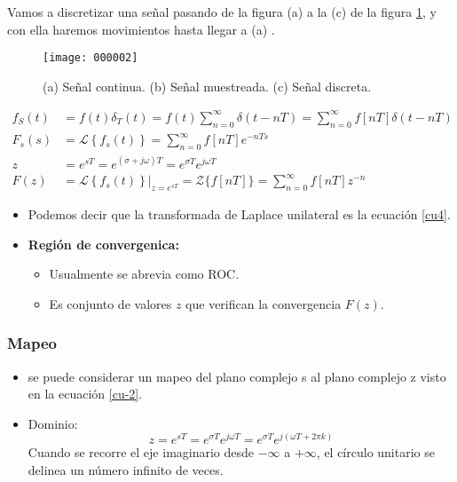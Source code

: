 Vamos a discretizar una señal pasando de la figura (a) a la (c) de la figura \ref{fig:000002}, y con ella haremos movimientos hasta llegar a (a) .



\begin{figure}[H]
	\centering
	\texttt{[image: 000002]}
	\caption{(a) Señal continua. (b) Señal muestreada. (c) Señal discreta.}
	\label{fig:000002}
\end{figure}

\setlength{\abovedisplayshortskip}{10pt}
\addtolength{\jot}{0.5em}

\begin{align}
	f_{S}(t) &=f(t) \delta_{T}(t)=f(t) \sum_{n=0}^{\infty} \delta(t-n T)=\sum_{n=0}^{\infty} f[n T] \delta(t-n T) \\
	F_{s}(s) &=\mathscr{L}\left\{f_{s}(t)\right\}=\sum_{n=0}^{\infty} f[n T] e^{-n T s} \label{cu-2} \\ 
	z & =e^{s T}=e^{(\sigma+j \omega) T}=e^{\sigma T} e^{j \omega T} \\
	F(z) &=\left.\mathscr{L}\left\{f_{s}(t)\right\}\right|_{z=e^{s T}}=\mathcal{Z}\{f[nT]\}=\sum_{n=0}^{\infty} f[n T] z^{-n} \label{cu4}
\end{align}

\begin{itemize}
	\item Podemos decir que la transformada de Laplace unilateral es la ecuación \ref{cu4}.
	\item \textbf{Región de convergenica:}
	\begin{itemize}
		\item Usualmente se abrevia como ROC.
		\item Es conjunto de valores $z$ que verifican la convergencia $F(z)$.
	\end{itemize}
\end{itemize}

\subsubsection{Mapeo}
\begin{itemize}
	\item se puede considerar un mapeo del plano complejo s al plano complejo z visto en la ecuación \ref{cu-2}.
	\item Dominio: 
	$$ z=e^{s T}=e^{\sigma T} e^{j \omega T}=e^{\sigma T} e^{j(\omega T+2 \pi k)}$$
	\subitem Cuando se recorre el eje imaginario desde $ - \infty$ a $ + \infty$, el círculo unitario se delinea un número infinito de veces.
\end{itemize}

